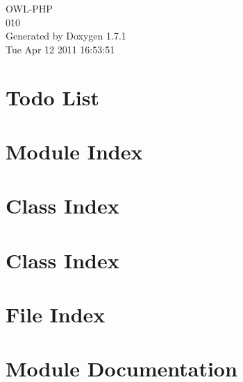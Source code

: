 \documentclass[a4paper]{book}
\begin{document}
\begin{titlepage}
\vspace*{7cm}
\begin{center}
{\Large OWL-\/PHP \\[1ex]\large 010 }\\
\vspace*{1cm}
{\large Generated by Doxygen 1.7.1}\\
\vspace*{0.5cm}
{\small Tue Apr 12 2011 16:53:51}\\
\end{center}
\end{titlepage}
\clearemptydoublepage
{}
\tableofcontents
\clearemptydoublepage
{}
\chapter{Todo List}
\label{todo}

\chapter{Module Index}

\chapter{Class Index}

\chapter{Class Index}

\chapter{File Index}

\chapter{Module Documentation}






\end{document}
